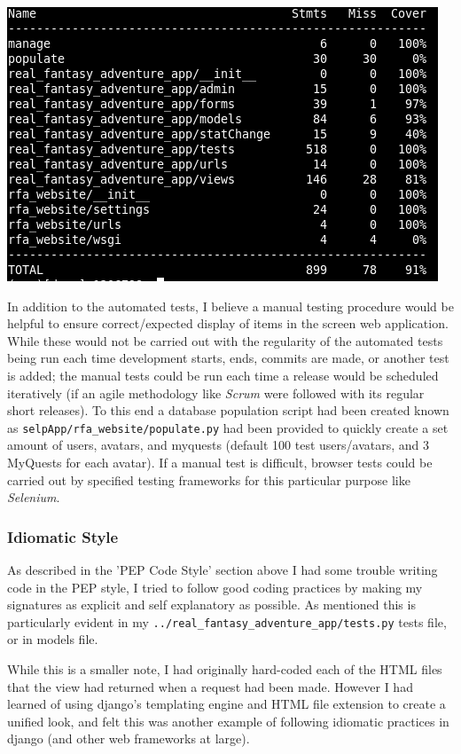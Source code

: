\documentclass[11pt,a4paper]{article}
\begin{document}
\begin{center}
\includegraphics[scale=0.5]{selpTestCoverage.png} \\
\end{center}

In addition to the automated tests, I believe a manual testing procedure would be helpful to ensure correct/expected display of items in the screen web application. While these would not be carried out with the regularity of the automated tests being run each time development starts, ends, commits are made, or another test is added; the manual tests could be run each time a release would be scheduled iteratively (if an agile methodology like \textit{Scrum} were followed with its regular short releases). To this end a database population script had been created known as \verb|selpApp/rfa_website/populate.py| had been provided to quickly create a set amount of users, avatars, and myquests (default 100 test users/avatars, and 3 MyQuests for each avatar). If a manual test is difficult, browser tests could be carried out by specified testing frameworks for this particular purpose like \textit{Selenium}.

\subsubsection{Idiomatic Style}
As described in the 'PEP Code Style' section above I had some trouble writing code in the PEP style, I tried to follow good coding practices by making my signatures as explicit and self explanatory as possible. As mentioned this is particularly evident in my \verb|../real_fantasy_adventure_app/tests.py| tests file, or in models file.

While this is a smaller note, I had originally hard-coded each of the HTML files that the view had returned when a request had been made. However I had learned of using django's templating engine and HTML file extension to create a unified look, and felt this was another example of following idiomatic practices in django (and other web frameworks at large).
\end{document}
